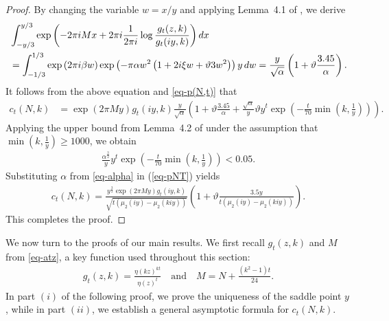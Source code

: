 \documentclass[11pt]{amsart}
\theoremstyle{plain}
\numberwithin{equation}{section}
\begin{document}
\begin{proof}
		By changing the variable $w=x/y$ and applying Lemma~4.1 of \cite{tyler}, we derive
		\begin{align*}
			\notag
			&\int_{-y/3}^{y/3}\exp\left(-2\pi i Mx+2\pi i\frac{1}{2\pi i}\log\frac{g_{t}(z,k)}{g_{t}(iy,k)}\right)dx\\&=\int_{-1/3}^{1/3}\exp\left(2\pi i\beta w\right)\exp\left(-\pi\alpha w^{2}\left(1+2i\xi w+\vartheta 3w^{2}\right)\right)y\,dw=\frac{y}{\sqrt{\alpha}}\left(1+\vartheta\frac{3.45}{\alpha}\right).
		\end{align*}
		It follows from the above equation and \eqref{eq-p(N,t)} that
		\begin{align}\label{eq-pNT}
			c_t(N,k) &=\exp(2\pi My)g_{t}(iy,k)\frac{y}{\sqrt{\alpha}}\left(1+\vartheta\frac{3.45}{\alpha}+\frac{\sqrt{\alpha}}{y}\vartheta y^{t} \exp\left(-\frac{t}{70}\min \left(k,\frac{1}{y}\right) \right)\right).
		\end{align}  
		Applying the upper bound from Lemma~4.2 of \cite{tyler} under the
		assumption that $\min (k,\frac{1}{y})\ge 1000$, we obtain
		\begin{align*}
			\frac{\alpha^{\frac{3}{2}}}{y} y^{t} \exp\left(-\frac{t}{70}\min \left(k,\frac{1}{y}\right) \right)<0.05.  
		\end{align*}
		Substituting $\alpha$ from \eqref{eq-alpha} in (\ref{eq-pNT}) yields
		\begin{align*}
			c_t(N,k)=\frac{y^{\frac{3}{2}}\exp(2\pi My)g_{t}(iy,k)}{\sqrt{t(\mu_{2}(iy)-\mu_2(kiy))}}\left(1+\vartheta\frac{3.5y}{t(\mu_{2}(iy)-\mu_2(kiy))}\right).    
		\end{align*}
		This completes the proof.
	\end{proof}
	We now turn to the proofs of our main results. We first recall $g_t(z,k)$ and $M$ from \eqref{eq-atz}, a key function used throughout this section:
	\begin{align*}
		g_{t}(z,k)=\frac{\eta(kz)^{kt}}{\eta(z)^{t}}\quad\text{and}\quad M=N+\frac{(k^{2}-1)t}{24}.
	\end{align*}
	In part $(i)$ of the following proof, we prove the uniqueness of the saddle point $y$, while in part $(ii)$, we establish a general asymptotic formula for $c_t(N,k)$.
\end{document}
